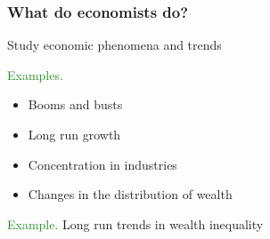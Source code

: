 \documentclass[
    xcolor={svgnames,dvipsnames},
    hyperref={colorlinks, citecolor=DeepPink4, linkcolor=DarkRed, urlcolor=DarkBlue}
    ]{beamer}  %
\newcommand{\Eg}{\textcolor{ForestGreen}{Example. }}
\newcommand{\Egs}{\textcolor{ForestGreen}{Examples. }}
\newcommand{\1}{\mathbbm 1}
\begin{document}
\begin{frame}
    \frametitle{What do economists do?}

    Study economic phenomena and trends

            \vspace{0.3em}
            \vspace{0.3em}
            \vspace{0.3em}
    \Egs

    \begin{itemize}
        \item Booms and busts
            \vspace{0.3em}
            \vspace{0.3em}
            \vspace{0.3em}
        \item Long run growth
            \vspace{0.3em}
            \vspace{0.3em}
            \vspace{0.3em}
        \item Concentration in industries
            \vspace{0.3em}
            \vspace{0.3em}
            \vspace{0.3em}
        \item Changes in the distribution of wealth
    \end{itemize}

\end{frame}

\begin{frame}
    
    \Eg Long run trends in wealth inequality

    \begin{figure}
        \centering
    \end{figure}


\end{frame}
\end{document}
